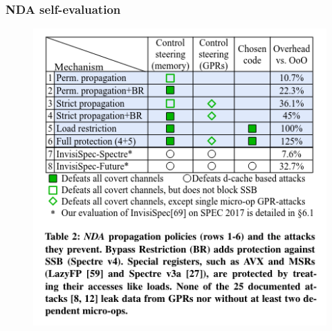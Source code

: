 \documentclass[11pt]{beamer}
\begin{document}
\begin{frame}
    \frametitle{NDA self-evaluation}

    \begin{figure}
        \centering
        \includegraphics[width=.6\textwidth]{NDA_eval.png}
    \end{figure}
    

\end{frame}
\end{document}
